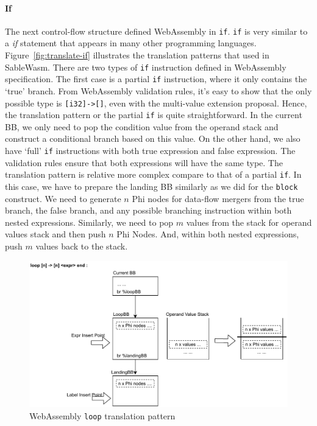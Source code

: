 \paragraph{If} The next control-flow structure defined WebAssembly in \texttt{if}. \texttt{if} is very similar to a \emph{if} statement that appears in many other programming languages. Figure~\ref{fig:translate-if} illustrates the translation patterns that used in SableWasm. There are two types of \texttt{if} instruction defined in WebAssembly specification. The first case is a partial \texttt{if} instruction, where it only contains the `true' branch. From WebAssembly validation rules, it's easy to show that the only possible type is \texttt{[i32]->[]}, even with the multi-value extension proposal. Hence, the translation pattern or the partial \texttt{if} is quite straightforward. In the current BB, we only need to pop the condition value from the operand stack and construct a conditional branch based on this value. On the other hand, we also have `full' \texttt{if} instructions with both true expression and false expression. The validation rules ensure that both expressions will have the same type. The translation pattern is relative more complex compare to that of a partial \texttt{if}. In this case, we have to prepare the landing BB similarly as we did for the \texttt{block} construct. We need to generate $n$ Phi nodes for data-flow mergers from the true branch, the false branch, and any possible branching instruction within both nested expressions. Similarly, we need to pop $m$ values from the stack for operand values stack and then push $n$ Phi Nodes. And, within both nested expressions, push $m$ values back to the stack.

\begin{figure}
  \centering
  \includegraphics[width=\textwidth]{Images/4.MIR/translate-loop.pdf}
  \caption{WebAssembly \texttt{loop} translation pattern}
  \label{fig:translate-loop}
\end{figure}

